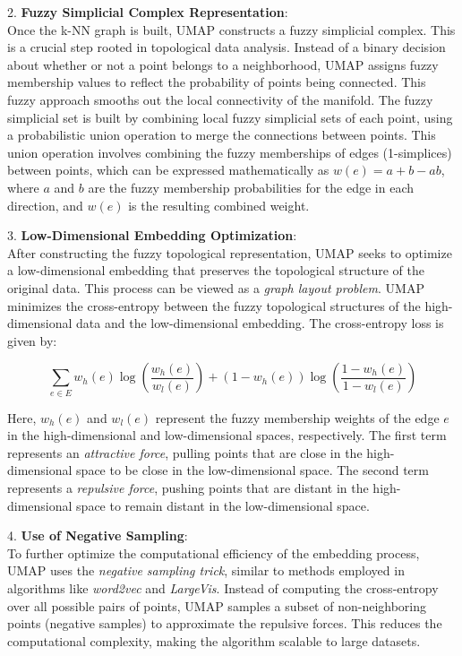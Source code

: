2. \textbf{Fuzzy Simplicial Complex Representation}:\\
Once the k-NN graph is built, UMAP constructs a fuzzy simplicial complex. This is a crucial step rooted in topological data analysis. Instead of a binary decision about whether or not a point belongs to a neighborhood, UMAP assigns fuzzy membership values to reflect the probability of points being connected. This fuzzy approach smooths out the local connectivity of the manifold. The fuzzy simplicial set is built by combining local fuzzy simplicial sets of each point, using a probabilistic union operation to merge the connections between points. This union operation involves combining the fuzzy memberships of edges (1-simplices) between points, which can be expressed mathematically as $w(e) = a + b - ab$, where $a$ and $b$ are the fuzzy membership probabilities for the edge in each direction, and $w(e)$ is the resulting combined weight.

3. \textbf{Low-Dimensional Embedding Optimization}:\\
After constructing the fuzzy topological representation, UMAP seeks to optimize a low-dimensional embedding that preserves the topological structure of the original data. This process can be viewed as a \textit{graph layout problem}. UMAP minimizes the cross-entropy between the fuzzy topological structures of the high-dimensional data and the low-dimensional embedding. The cross-entropy loss is given by:

\[
    \sum_{e \in E} w_h(e) \log \left( \frac{w_h(e)}{w_l(e)} \right) + (1 - w_h(e)) \log \left( \frac{1 - w_h(e)}{1 - w_l(e)} \right)
\]

Here, $w_h(e)$ and $w_l(e)$ represent the fuzzy membership weights of the edge $e$ in the high-dimensional and low-dimensional spaces, respectively. The first term represents an \textit{attractive force}, pulling points that are close in the high-dimensional space to be close in the low-dimensional space. The second term represents a \textit{repulsive force}, pushing points that are distant in the high-dimensional space to remain distant in the low-dimensional space.

4. \textbf{Use of Negative Sampling}:\\
To further optimize the computational efficiency of the embedding process, UMAP uses the \textit{negative sampling trick}, similar to methods employed in algorithms like \textit{word2vec} and \textit{LargeVis}. Instead of computing the cross-entropy over all possible pairs of points, UMAP samples a subset of non-neighboring points (negative samples) to approximate the repulsive forces. This reduces the computational complexity, making the algorithm scalable to large datasets.

